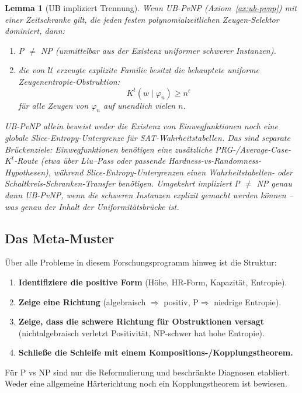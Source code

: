 \documentclass[aps,prd,twocolumn,superscriptaddress,nofootinbib]{revtex4-2}
\newtheorem{lemma}[theorem]{Lemma}
\theoremstyle{definition}
\theoremstyle{remark}
\newcommand{\PP}{\mathrm{P}}
\begin{document}
\begin{lemma}[UB impliziert Trennung]\label{lem:ub-separation}
Wenn UB-PvNP (Axiom~\ref{ax:ub-pvnp}) mit einer Zeitschranke gilt, die jeden
festen polynomialzeitlichen Zeugen-Selektor dominiert, dann:
\begin{enumerate}
\item[(a)] P $\neq$ NP (unmittelbar aus der Existenz uniformer schwerer Instanzen).
\item[(b)] die von $\mathcal{U}$ erzeugte explizite Familie besitzt die
behauptete uniforme Zeugenentropie-Obstruktion:
\[
  K^t(w\mid \varphi_n)\geq n^\varepsilon
\]
für alle Zeugen von $\varphi_n$ auf unendlich vielen $n$.
\end{enumerate}
UB-PvNP allein beweist weder die Existenz von Einwegfunktionen noch eine
globale Slice-Entropy-Untergrenze für SAT-Wahrheitstabellen.  Das sind
separate Brückenziele: Einwegfunktionen benötigen eine zusätzliche
PRG-/Average-Case-$K^t$-Route (etwa über Liu--Pass oder passende
Hardness-vs-Randomness-Hypothesen), während Slice-Entropy-Untergrenzen einen
Wahrheitstabellen- oder Schaltkreis-Schranken-Transfer benötigen.
Umgekehrt impliziert P $\neq$ NP genau dann UB-PvNP, wenn die schweren Instanzen \emph{explizit} gemacht werden können -- was genau der Inhalt der Uniformitätsbrücke ist.
\end{lemma}

\subsection{Das Meta-Muster}

Über alle Probleme in diesem Forschungsprogramm hinweg ist die Struktur:

\begin{enumerate}
\item \textbf{Identifiziere die positive Form} (Höhe, HR-Form, Kapazität, Entropie).
\item \textbf{Zeige eine Richtung} (algebraisch $\Rightarrow$ positiv, $\PP \Rightarrow$ niedrige Entropie).
\item \textbf{Zeige, dass die schwere Richtung für Obstruktionen versagt} (nichtalgebraisch verletzt Positivität, NP-schwer hat hohe Entropie).
\item \textbf{Schließe die Schleife mit einem Kompositions-/Kopplungstheorem.}
\end{enumerate}

Für P vs NP sind nur die Reformulierung und beschränkte Diagnosen etabliert. Weder eine allgemeine Härterichtung noch ein Kopplungstheorem ist bewiesen.
\end{document}
